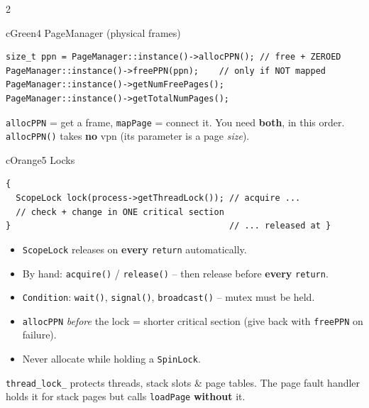 \documentclass[10pt,a4paper,landscape]{article}
\newcommand{\cc}[1]{\texttt{#1}}   %
\begin{document}
\begin{multicols}{2}
\begin{csec}{cGreen}{4 \quad PageManager \quad\normalfont(physical frames)}
\begin{lstlisting}
size_t ppn = PageManager::instance()->allocPPN(); // free + ZEROED
PageManager::instance()->freePPN(ppn);    // only if NOT mapped
PageManager::instance()->getNumFreePages();
PageManager::instance()->getTotalNumPages();
\end{lstlisting}
\begin{tip}[cGreen]
  \cc{allocPPN} = get a frame, \cc{mapPage} = connect it. You need \textbf{both}, in this order.
  \cc{allocPPN()} takes \textbf{no} vpn (its parameter is a page \emph{size}).
\end{tip}
\end{csec}

\begin{csec}{cOrange}{5 \quad Locks}
\begin{lstlisting}
{
  ScopeLock lock(process->getThreadLock()); // acquire ...
  // check + change in ONE critical section
}                                           // ... released at }
\end{lstlisting}
\begin{itemize}
  \item \cc{ScopeLock} releases on \textbf{every} \cc{return} automatically.
  \item By hand: \cc{acquire()} / \cc{release()} -- then release before \textbf{every} \cc{return}.
  \item \cc{Condition}: \cc{wait()}, \cc{signal()}, \cc{broadcast()} -- mutex must be held.
  \item \cc{allocPPN} \emph{before} the lock = shorter critical section
        (give back with \cc{freePPN} on failure).
  \item Never allocate while holding a \cc{SpinLock}.
\end{itemize}
\begin{tip}[cOrange]
  \cc{thread\_lock\_} protects threads, stack slots \& page tables. The page fault handler
  holds it for stack pages but calls \cc{loadPage} \textbf{without} it.
\end{tip}
\end{csec}


\end{multicols}
\end{document}

